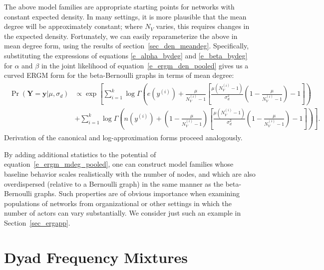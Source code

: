 \documentclass[11pt]{article}
\begin{document}
The above model families are appropriate starting points for networks with constant expected density.  In many settings, it is more plausible that the mean degree will be approximately constant; where $N_V$ varies, this requires changes in the expected density.  Fortunately, we can easily reparameterize the above in mean degree form, using the results of section~\ref{sec_den_meandeg}.  Specifically, substituting the expressions of equations \ref{e_alpha_bydeg} and \ref{e_beta_bydeg} for $\alpha$ and $\beta$ in the joint likelihood of equation~\ref{e_ergm_den_pooled} gives us a curved ERGM form for the beta-Bernoulli graphs in terms of mean degree: 
\begin{align}
\begin{split}
\Pr(\mathbf{Y}=\mathbf{y}|\mu,\sigma_d) &\propto \exp\left[\sum_{i=1}^k \log\Gamma\left(e\left(y^{(i)}\right)+\frac{\mu}{N_V^{(i)}-1} \left[\frac{\mu (N_V^{(i)}-1)}{\sigma_d^2}\left(1-\frac{\mu}{N_V^{(i)}-1}\right) -1\right]\right) \right.\\
&\left.+ \sum_{i=1}^k  \log\Gamma\left(n\left(y^{(i)}\right)+\left(1-\frac{\mu}{N_V^{(i)}-1}\right) \left[\frac{\mu (N_V^{(i)}-1)}{\sigma_d^2}\left(1-\frac{\mu}{N_V^{(i)}-1}\right) -1\right]\right)\right]. \label{e_ergm_mdeg_pooled}
\end{split}
\end{align}
Derivation of the canonical and log-approximation forms proceed analogously.  

By adding additional statistics to the potential of equation~\ref{e_ergm_mdeg_pooled}, one can construct model families whose baseline behavior scales realistically with the number of nodes, and which are also overdispersed (relative to a Bernoulli graph) in the same manner as the beta-Bernoulli graphs.  Such properties are of obvious importance when examining populations of networks from organizational or other settings in which the number of actors can vary substantially.  We consider just such an example in Section~\ref{sec_ergapp}.

\section{Dyad Frequency Mixtures} \label{sec_manmix}
\end{document}

